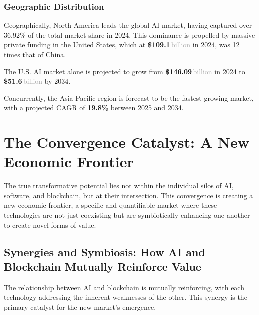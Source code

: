 \documentclass[11pt,a4paper]{report}
\newcommand{\marketvalue}[2]{\textcolor{trust}{\textbf{\$#1}}\,\textcolor{darkgray}{#2}}
\newcommand{\cagr}[1]{\textcolor{sun}{\textbf{#1\%}}}
\begin{document}
\subsection{Geographic Distribution}
Geographically, North America leads the global AI market, having captured over 36.92\% of the total market share in 2024. This dominance is propelled by massive private funding in the United States, which at \marketvalue{109.1}{billion} in 2024, was 12 times that of China.

The U.S. AI market alone is projected to grow from \marketvalue{146.09}{billion} in 2024 to \marketvalue{51.6}{billion} by 2034.

Concurrently, the Asia Pacific region is forecast to be the fastest-growing market, with a projected CAGR of \cagr{19.8} between 2025 and 2034.

\chapter{The Convergence Catalyst: A New Economic Frontier}

The true transformative potential lies not within the individual silos of AI, software, and blockchain, but at their intersection. This convergence is creating a new economic frontier, a specific and quantifiable market where these technologies are not just coexisting but are symbiotically enhancing one another to create novel forms of value.

\section{Synergies and Symbiosis: How AI and Blockchain Mutually Reinforce Value}

The relationship between AI and blockchain is mutually reinforcing, with each technology addressing the inherent weaknesses of the other. This synergy is the primary catalyst for the new market's emergence.
\end{document}
